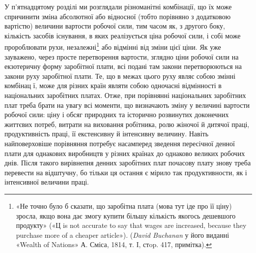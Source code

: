 У п’ятнадцятому розділі ми розглядали різноманітні комбінації,
що їх може спричинити зміна абсолютної або відносної
(тобто порівняно з додатковою вартістю) величини вартости робочої
сили, тим часом як, з другого боку, кількість засобів існування,
в яких реалізується ціна робочої сили, і собі може пророблювати
рухи, незалежні\footnote{
«Не точно було б сказати, що заробітна плата (мова тут іде про
її ціну) зросла, якщо вона дає змогу купити більшу кількість якогось
дешевшого продукту» («Ц is not accurate to say that wages are increased,
because they purchase more of a cheaper article»). (\emph{David Buchanan}
у його виданні «Wealth of Nations» А. Сміса, 1814, т. I, стop. 417,
примітка).
} або відмінні від зміни цієї ціни. Як уже зауважено,
через просте перетворення вартости, зглядно ціни робочої
сили на екзотеричну форму заробітної плати, всі подані там
закони перетворюються на закони руху заробітної плати. Те,
що в межах цього руху являє собою змінні комбінац ї, може для
різних країн являти собою одночасні відмінності в національних
заробітних платах. Отже, при порівнянні національних заробітних
плат треба брати на увагу всі моменти, що визначають зміну
у величині вартости робочої сили: ціну і обсяг природних та
історично розвинутих доконечних життєвих потреб, витрати
на виховання робітника, ролю жіночої й дитячої праці, продуктивність
праці, її екстенсивну й інтенсивну величину. Навіть
найповерховіше порівняння потребує насамперед зведення пересічної
денної плати для однакових виробництв у різних країнах
до однаково великих робочих днів. Після такого вирівнепня денних
заробітних плат почасову плату знову треба перевести на
відштучну, бо тільки ця остання є мірило так продуктивности,
як і інтенсивної величини праці.
